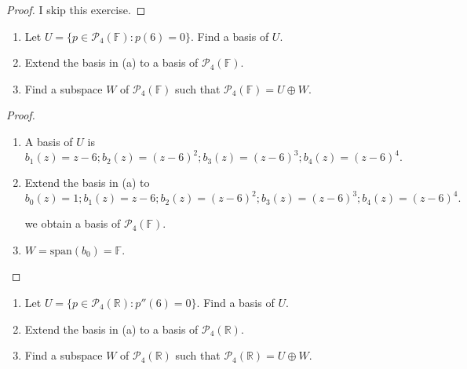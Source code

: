 \begin{proof}
    I skip this exercise.
\end{proof}

\begin{exercise}
    \begin{enumerate}[label={(\alph*)}]
        \item Let $U = \{ p\in\mathcal{P}_{4}(\mathbb{F}): p(6) = 0 \}$. Find a basis of $U$.
        \item Extend the basis in (a) to a basis of $\mathcal{P}_{4}(\mathbb{F})$.
        \item Find a subspace $W$ of $\mathcal{P}_{4}(\mathbb{F})$ such that $\mathcal{P}_{4}(\mathbb{F}) = U\oplus W$.
    \end{enumerate}
\end{exercise}

\begin{proof}
    \begin{enumerate}[label={(\alph*)}]
        \item A basis of $U$ is
              \[
                  b_{1}(z) = z - 6; b_{2}(z) = {(z - 6)}^{2}; b_{3}(z) = {(z - 6)}^{3}; b_{4}(z) = {(z-6)}^{4}.
              \]
        \item Extend the basis in (a) to
              \[
                  b_{0}(z) = 1; b_{1}(z) = z - 6; b_{2}(z) = {(z - 6)}^{2}; b_{3}(z) = {(z - 6)}^{3}; b_{4}(z) = {(z-6)}^{4}.
              \]

              we obtain a basis of $\mathcal{P}_{4}(\mathbb{F})$.
        \item $W = \text{span}(b_{0}) = \mathbb{F}$.
    \end{enumerate}
\end{proof}

\begin{exercise}
    \begin{enumerate}[label={(\alph*)}]
        \item Let $U = \{ p\in\mathcal{P}_{4}(\mathbb{R}): p''(6) = 0 \}$. Find a basis of $U$.
        \item Extend the basis in (a) to a basis of $\mathcal{P}_{4}(\mathbb{R})$.
        \item Find a subspace $W$ of $\mathcal{P}_{4}(\mathbb{R})$ such that $\mathcal{P}_{4}(\mathbb{R}) = U\oplus W$.
    \end{enumerate}
\end{exercise}

